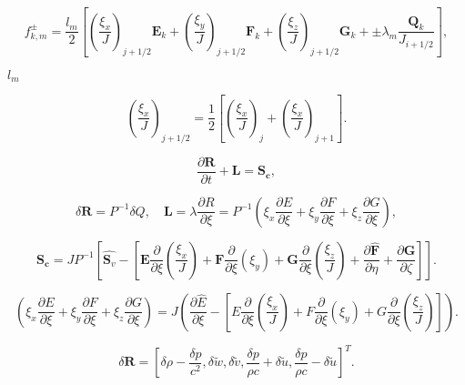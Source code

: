 \documentclass{article}
\begin{document}
\[ \begin{equation*} f^{\pm}_{k,m}=\frac{l_m}{2}\left[\left(\frac{\xi_x}{J}\right)_{j+1/2} \mathbf{E}_k +\left(\frac{\xi_y}{J}\right)_{j+1/2} \mathbf{F}_k +\left(\frac{\xi_z}{J}\right)_{j+1/2} \mathbf{G}_k +\pm \lambda_m \frac{\mathbf{Q}_k}{J_{i+1/2}} \right], \end{equation*} \]
\pagebreak

$l_m$
\pagebreak

\[ \begin{equation*} \left(\frac{\xi_x}{J}\right)_{j+1/2}=\frac{1}{2}\left[\left(\frac{\xi_x}{J}\right)_j+\left(\frac{\xi_x}{J}\right)_{j+1}\right]. \end{equation*} \]
\pagebreak

\[ \begin{equation*} \frac{\partial \mathbf{R}}{\partial t}+\mathbf{L}=\mathbf{S_c}, \end{equation*} \]
\pagebreak

\[ \begin{equation*} \delta \mathbf{R}= P^{-1} \delta Q, \quad \mathbf{L}=\lambda \frac{\partial R}{\partial \xi}=P^{-1}\left(\xi_x \frac{\partial E}{\partial \xi}+ \xi_y \frac{\partial F}{\partial \xi}+\xi_z \frac{\partial G}{\partial \xi} \right), \end{equation*} \]
\pagebreak

\[ \begin{equation*} \mathbf{S_c}=J P^{-1}\left[\hat{\mathbf{S}_v}-\left[\mathbf{E}\frac{\partial}{\partial \xi}\left(\frac{\xi_x}{J}\right)+\mathbf{F} \frac{\partial}{\partial \xi}\left( \xi_y\right)+\mathbf{G} \frac{\partial}{\partial \xi}\left(\frac{\xi_z}{J}\right)+\frac{\partial \hat{\mathbf{F}}}{\partial \eta}+\frac{\partial \hat{\mathbf{G}}} {\partial \zeta} \right]\right]. \end{equation*} \]
\pagebreak

\[ \begin{equation*} \left(\xi_x \frac{\partial E}{\partial \xi}+ \xi_y \frac{\partial F}{\partial \xi}+\xi_z \frac{\partial G}{\partial \xi} \right)=J\left(\frac{\partial \hat{E}}{\partial \xi}-\left[E\frac{\partial}{\partial \xi}\left(\frac{\xi_x}{J}\right)+F \frac{\partial}{\partial \xi}\left( \xi_y\right)+G \frac{\partial}{\partial \xi}\left(\frac{\xi_z}{J}\right) \right]\right). \end{equation*} \]
\pagebreak

\[ \begin{equation*} \delta \mathbf{R}=\left[\delta \rho -\frac{\delta p}{c^2}, \delta \tilde{w},\delta \tilde{v},\frac{\delta p}{\rho c}+\delta \tilde{u}, \frac{\delta p}{\rho c}-\delta \tilde{u}\right]^T. \end{equation*} \]
\pagebreak
\end{document}
